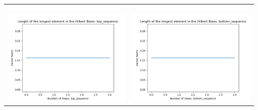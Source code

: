 \documentclass[10pt]{article}
\begin{document}
\begin{tabular}{c|c}
\begin{minipage}{.45\textwidth}
\end{minipage} \\ \\
\hline \\\begin{minipage}{.45\textwidth}
\includegraphics[width=\textwidth]{"DATA/4d/4 generators 2 bound C/top_sequence LENGTH"}
\end{minipage} &
\begin{minipage}{.45\textwidth}
\includegraphics[width=\textwidth]{"DATA/4d/4 generators 2 bound C bottomup/bottom_sequence LENGTH"}
\end{minipage}
\end{tabular}
\end{document}
